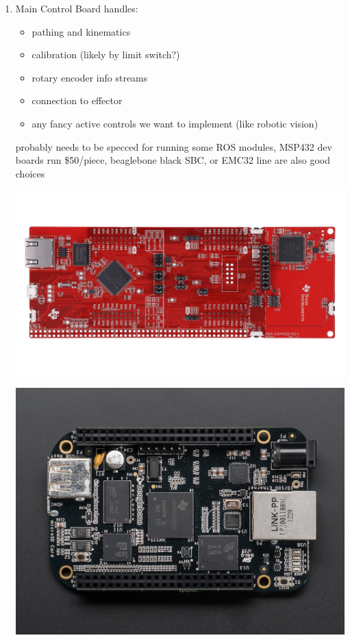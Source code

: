 \documentclass[11pt]{article}
\begin{document}
\begin{enumerate}
\item Main Control Board
\label{sec:orgf501a3a}
handles:
\begin{itemize}
\item pathing and kinematics
\item calibration (likely by limit switch?)
\item rotary encoder info streams
\item connection to effector
\item any fancy active controls we want to implement (like robotic vision)
\end{itemize}
probably needs to be specced for running some ROS modules, MSP432 dev boards run \$50/piece, beaglebone black SBC, or EMC32 line are also good choices
\begin{center}
\includegraphics[width=.9\linewidth]{Main_Control_Board/2022-07-18_14-30-59_screenshot.png}
\end{center}
\begin{center}
\includegraphics[width=.9\linewidth]{Main_Control_Board/2022-07-18_14-28-49_screenshot.png}
\end{center}


\end{enumerate}
\end{document}

